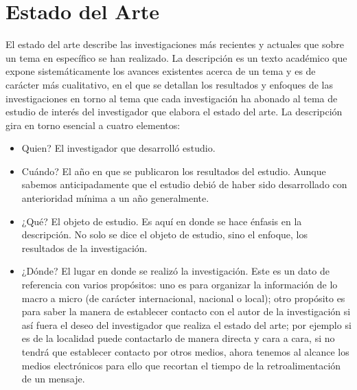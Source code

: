 \documentclass[runningheads]{llncs}
\begin{document}
\section{Estado del Arte}
El estado del arte describe las investigaciones más recientes y actuales que sobre un tema en específico se han
realizado.
La descripción es un texto académico que expone sistemáticamente los avances existentes acerca de un tema y es de carácter más cualitativo, en el que se detallan los resultados y enfoques de las investigaciones en torno al tema que cada investigación ha abonado al tema de estudio de interés del investigador que elabora el estado del arte. La descripción gira en torno esencial a cuatro elementos:
\begin{itemize}
    \item Quien? El investigador que desarrolló estudio.
    \item Cuándo? El año en que se publicaron los resultados del estudio. Aunque sabemos anticipadamente que el estudio debió de haber sido desarrollado con anterioridad mínima a un año generalmente.
    \item ¿Qué? El objeto de estudio. Es aquí en donde se hace énfasis en la descripción. No solo se dice el objeto de estudio, sino el enfoque, los resultados de la investigación.
    \item ¿Dónde? El lugar en donde se realizó la investigación. Este es un dato de referencia con varios propósitos: uno es para organizar la información de lo macro a micro (de carácter internacional, nacional o local); otro propósito es para saber la manera de establecer contacto con el autor de la investigación si así fuera el deseo del investigador que realiza el estado del arte; por ejemplo si es de la localidad puede contactarlo de manera directa y cara a cara, si no tendrá que establecer contacto por otros medios, ahora tenemos al alcance los medios electrónicos para ello que recortan el tiempo de la retroalimentación de un mensaje.
\end{itemize}
\end{document}
